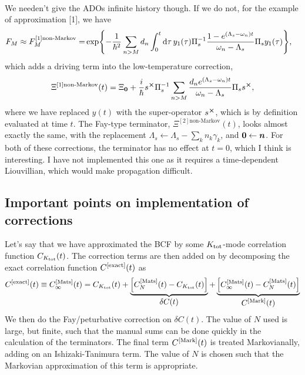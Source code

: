 \documentclass{article}
\begin{document}
\\[6pt]
We needen't give the ADOs infinite history though. If we do not, for the example of approximation [1], we have
\begin{align}
   F_M\approx  F_M^{[1]\text{non-Markov}} 
     =&\exp{
     -\frac{1}{\hbar^2}\sum_{n>M}d_n\int_0^t{\rm d}\tau\,y_1(\tau)\Pi_s^{-1}\frac{1-e^{(\Lambda_s-\omega_n)t}}{\omega_n-\Lambda_s}\Pi_s y_1(\tau)},
\end{align}
which adds a driving term into the low-temperature correction,
\begin{align}
    \Xi^{[1]\text{non-Markov}}(t) = \Xi_{\boldsymbol{0}} + \frac{i}{\hbar} s^{\cross}\Pi_s^{-1}\sum_{n>M}\frac{d_ne^{(\Lambda_s-\omega_n)t}}{\omega_n-\Lambda_s}\Pi_s s^{\cross},
\end{align}
where we have replaced $y(t)$ with the super-operator $s^{\cross}$\!, which is by definition evaluated at time $t$. The Fay-type terminator, $\Xi^{[2]\text{non-Markov}}(t)$, looks almost exactly the same, with the replacement $\Lambda_s\leftarrow\Lambda_s-\sum_k n_k\gamma_k$, and $\boldsymbol{0}\leftarrow\boldsymbol{n}$. For both of these corrections, the terminator has no effect at $t=0$, which I think is interesting. I have not implemented this one as it requires a time-dependent Liouvillian, which would make propagation difficult.
\subsection{Important points on implementation of corrections}
Let's say that we have approximated the BCF by some $K_{\rm tot}$-mode correlation function $C_{K_{\rm tot}}(t)$. The correction terms are then added on by decomposing the exact correlation function $C^{\rm [exact]}(t)$ as
\begin{align}
    C^{\rm [exact]}(t)\equiv C^{[\rm Mats]}_{{\infty}}(t) = C_{K_{\rm tot}}(t) + \underbrace{\l[C^{[\rm Mats]}_{{N}}(t)-C_{{K_{\rm tot}}}(t)\r]}_{\mathlarger{\delta C(t)}} + \underbrace{\l[C^{[\rm Mats]}_{{\infty}}(t)-C^{[\rm Mats]}_{{N}}(t)\r]}_{\mathlarger{C^{\rm [Mark]}(t)}}
\end{align}
We then do the Fay/peturbative correction on $\delta C(t)$. The value of $N$ used is large, but finite, such that the manual sums can be done quickly in the calculation of the terminators. The final term $C^{\rm [Mark]}(t)$ is treated Markovianally, adding on an Ishizaki-Tanimura term. The value of $N$ is chosen such that the Markovian approximation of this term is appropriate.
\end{document}
